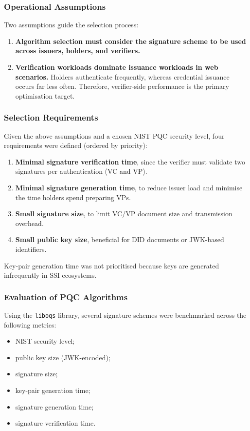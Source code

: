 \subsubsection*{Operational Assumptions}
Two assumptions guide the selection process:
\begin{enumerate}
    \item \textbf{Algorithm selection must consider the signature scheme to be used across issuers, holders, and verifiers.}
    \item \textbf{Verification workloads dominate issuance workloads in web scenarios.}  
    Holders authenticate frequently, whereas credential issuance occurs far less often.  
    Therefore, verifier-side performance is the primary optimisation target.
\end{enumerate}

\subsubsection*{Selection Requirements}
Given the above assumptions and a chosen NIST PQC security level, four requirements were defined (ordered by priority):
\begin{enumerate}
    \item \textbf{Minimal signature verification time}, since the verifier must validate two signatures per authentication (VC and VP).
    \item \textbf{Minimal signature generation time}, to reduce issuer load and minimise the time holders spend preparing VPs.
    \item \textbf{Small signature size}, to limit VC/VP document size and transmission overhead.
    \item \textbf{Small public key size}, beneficial for DID documents or JWK-based identifiers.
\end{enumerate}
Key-pair generation time was not prioritised because keys are generated infrequently in SSI ecosystems.

\subsubsection*{Evaluation of PQC Algorithms}
Using the \texttt{liboqs} library, several signature schemes were benchmarked across the following metrics:
\begin{itemize}
    \item NIST security level;
    \item public key size (JWK-encoded);
    \item signature size;
    \item key-pair generation time;
    \item signature generation time;
    \item signature verification time.
\end{itemize}

